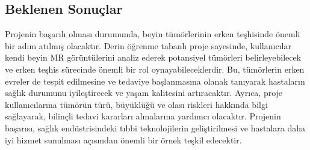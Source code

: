 \documentclass[12pt,a4paper]{article}
\begin{document}
\begin{center}
\begin{enumerate}
\begin{enumerate}
				
				
				
				\clearpage
				
				\begin{center}
					\section*{Beklenen Sonuçlar}
				\end{center}
			Projenin başarılı olması durumunda, beyin tümörlerinin erken teşhisinde önemli bir adım atılmış olacaktır. Derin öğrenme tabanlı proje sayesinde, kullanıcılar kendi beyin MR görüntülerini analiz ederek potansiyel tümörleri belirleyebilecek ve erken teşhis sürecinde önemli bir rol oynayabileceklerdir. Bu, tümörlerin erken evreler
			de tespit edilmesine ve tedaviye başlanmasına olanak tanıyarak hastaların sağlık durumunu iyileştirecek ve yaşam kalitesini artıracaktır. Ayrıca, proje kullanıcılarına tümörün türü, büyüklüğü ve olası riskleri hakkında bilgi sağlayarak, bilinçli tedavi kararları almalarına yardımcı olacaktır. Projenin başarısı, sağlık endüstrisindeki tıbbi teknolojilerin geliştirilmesi ve hastalara daha iyi hizmet sunulması açısından önemli bir örnek teşkil edecektir.
				
				
				
				
				
				
			\end{enumerate}
		\end{enumerate}
		
	
			
		
		
		
		
		
		
	\end{center}
	
	
	
	
\end{document}
